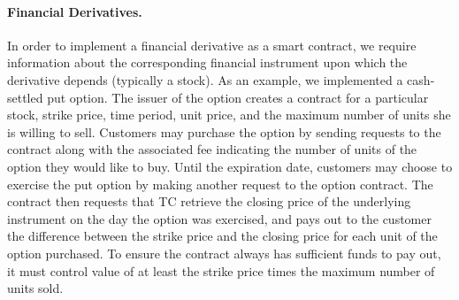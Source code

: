 \paragraph{Financial Derivatives.}  In order to implement a financial derivative as a smart contract, we require information about the corresponding financial instrument upon which the derivative depends (typically a stock).  As an example, we implemented a cash-settled put option.  The issuer of the option creates a contract for a particular stock, strike price, time period, unit price, and the maximum number of units she is willing to sell.  Customers may purchase the option by sending requests to the contract along with the associated fee indicating the number of units of the option they would like to buy.  Until the expiration date, customers may choose to exercise the put option by making another request to the option contract.  The contract then requests that TC retrieve the closing price of the underlying instrument on the day the option was exercised, and pays out to the customer the difference between the strike price and the closing price for each unit of the option purchased.  To ensure the contract always has sufficient funds to pay out, it must control value of at least the strike price times the maximum number of units sold.
\fi

